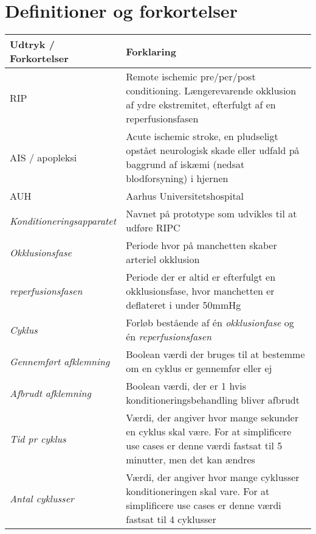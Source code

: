 	\section{Definitioner og forkortelser}
	\begin{longtable}{ |p{} |p{}| } 
		\hline
		\rowcolor{usDef}
		\textbf{Udtryk / Forkortelser} &  \textbf{Forklaring} \\
		\hline
		RIP & Remote ischemic pre/per/post conditioning. Længerevarende okklusion af ydre ekstremitet, efterfulgt af en reperfusionsfasen\\
		\hline
		AIS / apopleksi & Acute ischemic stroke, en pludseligt opstået neurologisk skade eller udfald på baggrund af iskæmi (nedsat blodforsyning) i hjernen \\
		\hline
		AUH & Aarhus Universitetshospital \\
		\hline
		\textit{Konditioneringsapparatet} & Navnet på prototype som udvikles til at udføre RIPC \\
		\hline
		\textit{Okklusionsfase} & Periode hvor på manchetten skaber arteriel okklusion \\
		\hline
		\textit{reperfusionsfasen} & Periode der er altid er efterfulgt en okklusionsfase, hvor manchetten er deflateret i under 50mmHg\\
		\hline
		\textit{Cyklus} & Forløb bestående af én \textit{okklusionfase} og én \textit{reperfusionsfasen} \\
		\hline
		\textit{Gennemført afklemning} & Boolean værdi der bruges til at bestemme om en cyklus er gennemfør eller ej \\
		\hline
		\textit{Afbrudt afklemning} & Boolean værdi, der er 1 hvis konditioneringsbehandling bliver afbrudt \\ 
		\hline
		\textit{Tid pr cyklus} & Værdi, der angiver hvor mange sekunder en cyklus skal være. For at simplificere use cases er denne værdi fastsat til 5 minutter, men det kan ændres \\
		\hline
		\textit{Antal cyklusser} & Værdi, der angiver hvor mange cyklusser konditioneringen skal vare. For at simplificere use cases er denne værdi fastsat til 4 cyklusser \\
		\hline
	\end{longtable}
	
	\newpage
